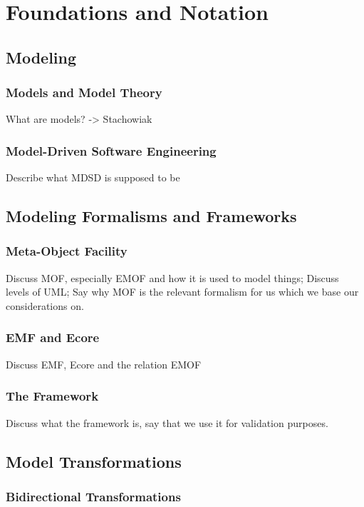 \chapter{Foundations and Notation
}
\label{chap:foundations}

\section{Modeling}

\subsection{Models and Model Theory}
What are models? -> Stachowiak

\subsection{Model-Driven Software Engineering}
Describe what MDSD is supposed to be


\section{Modeling Formalisms and Frameworks}

\subsection{Meta-Object Facility}
Discuss \gls{MOF}, especially \gls{EMOF} and how it is used to model things;
Discuss levels of UML;
Say why MOF is the relevant formalism for us which we base our considerations on.

\subsection{EMF and Ecore}
Discuss \gls{EMF}, Ecore and the relation EMOF

\subsection{The \vitruv Framework}
Discuss what the \vitruv framework is, say that we use it for validation purposes.


\section{Model Transformations}

\subsection{Bidirectional Transformations}

